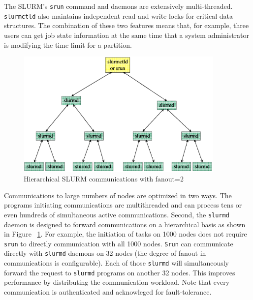 \documentclass[10pt,onecolumn,times]{../common/llncs}
\begin{document}
{The SLURM's {\tt srun} command and  daemons are extensively 
multi-threaded. 
{\tt slurmctld} also maintains independent read and 
write locks for critical data structures. 
The combination of these two features means that, 
for example, three users can get job state information at the same
time that a system administrator is modifying the time limit 
for a partition.

\begin{figure}[tcb]
\centerline{\includegraphics[width=4in]{../figures/comm.eps}}
\caption{\small Hierarchical SLURM communications with fanout=2}
\label{comms}
\end{figure}

Communications to large numbers of nodes are optimized in two 
ways. The programs initiating communications are multithreaded
and can process tens or even hundreds of simultaneous active 
communications. 
Second, the {\tt slurmd} daemon is designed to forward 
communications on a hierarchical basis as shown in Figure ~\ref{comms}.
For example, the initiation of tasks on 1000 nodes does not require
{\tt srun} to directly communication with all 1000 nodes. {\tt Srun}
can communicate directly with {\tt slurmd} daemons on 32 nodes
(the degree of fanout in communications is configurable). 
Each of those {\tt slurmd} will simultaneously forward the request
to {\tt slurmd} programs on another 32 nodes. 
This improves performance by distributing the communication workload.
Note that every communication is authenticated and acknowleged 
for fault-tolerance.

}
\end{document}

